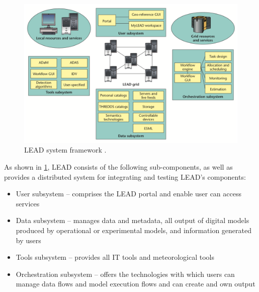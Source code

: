 \begin{figure}[htp]
    \centering
    \includegraphics[width=1.0\textwidth]{lit/lead/LEAD-system-framework-LEAD-is-composed-of-several-interacting-subsystems-with-the-LEAD_W640.png}
    \caption[LEAD system framework]{LEAD system framework \cite{Droegemeier2005Service-OrientedWeather}.}
    \label{fi:lead_framework}
\end{figure}

As shown in \cref{fi:lead_framework}, LEAD consists of the following sub-components, as well as provides a distributed system for integrating and testing LEAD's components:
\begin{itemize}
    \item User subsystem – comprises the LEAD portal and enable user can access services
    \item Data subsystem – manages data and metadata, all output of digital models produced by operational or experimental models, and information generated by users
    \item Tools subsystem – provides all IT tools and meteorological tools
    \item Orchestration subsystem – offers the technologies with which users can manage data flows and model execution flows and can create and own output
\end{itemize}

